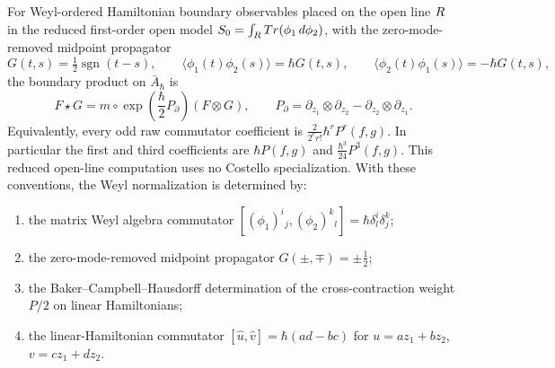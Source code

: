 \documentclass[11pt]{memoir}
\begin{document}
\begin{prop}\label{prop:conditional-boundary-product-normalization}
  For Weyl-ordered Hamiltonian boundary observables placed on the open line
  $R$ in the reduced first-order open model
  $S_0=\int_{R}Tr(\phi_1\,d\phi_2)$, with the zero-mode-removed
  midpoint propagator
  $$G(t,s)=\tfrac{1}{2}\operatorname{sgn}(t-s),\qquad
    \langle\phi_1(t)\phi_2(s)\rangle=\hbar G(t,s),\qquad
    \langle\phi_2(t)\phi_1(s)\rangle=-\hbar G(t,s),$$
  the boundary product on $\bar A_\hbar$ is
  $$F\star G=m\circ\exp\!\left(\frac{\hbar}{2}P_{\partial}\right)(F\otimes G),
    \qquad P_{\partial}=\partial_{z_1}\otimes\partial_{z_2}
      -\partial_{z_2}\otimes\partial_{z_1}.$$
  Equivalently, every odd raw commutator coefficient is
  $\frac{2}{2^r r!}\hbar^r P^r(f,g)$. In particular the first and third
  coefficients are $\hbar P(f,g)$ and $\frac{\hbar^3}{24}P^3(f,g)$. This
  reduced open-line computation uses no Costello specialization. With these
  conventions, the Weyl normalization is determined by:
  \begin{enumerate}
    \item the matrix Weyl algebra commutator
      $[(\phi_1)^i{}_j,(\phi_2)^k{}_l]=\hbar\delta^i_l\delta^k_j$;
    \item the zero-mode-removed midpoint propagator
      $G(\pm,\mp)=\pm\tfrac12$;
    \item the Baker--Campbell--Hausdorff determination of the cross-contraction
      weight $P/2$ on linear Hamiltonians;
    \item the linear-Hamiltonian commutator
      $[\widehat u,\widehat v]=\hbar(ad-bc)$ for $u=az_1+bz_2$,
      $v=cz_1+dz_2$.
  \end{enumerate}
\end{prop}
\end{document}
